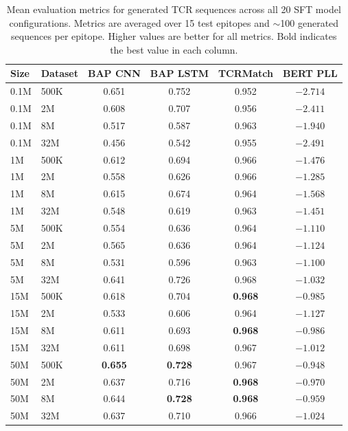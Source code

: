 \documentclass[12pt]{article}
\begin{document}
\begin{table}[H]
\centering
\caption{Mean evaluation metrics for generated TCR sequences across all 20 SFT model
configurations. Metrics are averaged over 15 test epitopes and $\sim$100 generated sequences
per epitope. Higher values are better for all metrics. Bold indicates the best value in each
column.}
\label{tab:eval}
\begin{tabular}{llcccc}
\toprule
Size & Dataset & BAP CNN & BAP LSTM & TCRMatch & BERT PLL \\
\midrule
0.1M & 500K & 0.651 & 0.752 & 0.952 & $-2.714$ \\
0.1M & 2M   & 0.608 & 0.707 & 0.956 & $-2.411$ \\
0.1M & 8M   & 0.517 & 0.587 & 0.963 & $-1.940$ \\
0.1M & 32M  & 0.456 & 0.542 & 0.955 & $-2.491$ \\
\midrule
1M   & 500K & 0.612 & 0.694 & 0.966 & $-1.476$ \\
1M   & 2M   & 0.558 & 0.626 & 0.966 & $-1.285$ \\
1M   & 8M   & 0.615 & 0.674 & 0.964 & $-1.568$ \\
1M   & 32M  & 0.548 & 0.619 & 0.963 & $-1.451$ \\
\midrule
5M   & 500K & 0.554 & 0.636 & 0.964 & $-1.110$ \\
5M   & 2M   & 0.565 & 0.636 & 0.964 & $-1.124$ \\
5M   & 8M   & 0.531 & 0.596 & 0.963 & $-1.100$ \\
5M   & 32M  & 0.641 & 0.726 & 0.968 & $-1.032$ \\
\midrule
15M  & 500K & 0.618 & 0.704 & \textbf{0.968} & $-0.985$ \\
15M  & 2M   & 0.533 & 0.606 & 0.964 & $-1.127$ \\
15M  & 8M   & 0.611 & 0.693 & \textbf{0.968} & $-0.986$ \\
15M  & 32M  & 0.611 & 0.698 & 0.967 & $-1.012$ \\
\midrule
50M  & 500K & \textbf{0.655} & \textbf{0.728} & 0.967 & $\mathbf{-0.948}$ \\
50M  & 2M   & 0.637 & 0.716 & \textbf{0.968} & $-0.970$ \\
50M  & 8M   & 0.644 & \textbf{0.728} & \textbf{0.968} & $-0.959$ \\
50M  & 32M  & 0.637 & 0.710 & 0.966 & $-1.024$ \\
\bottomrule
\end{tabular}
\end{table}
\end{document}
